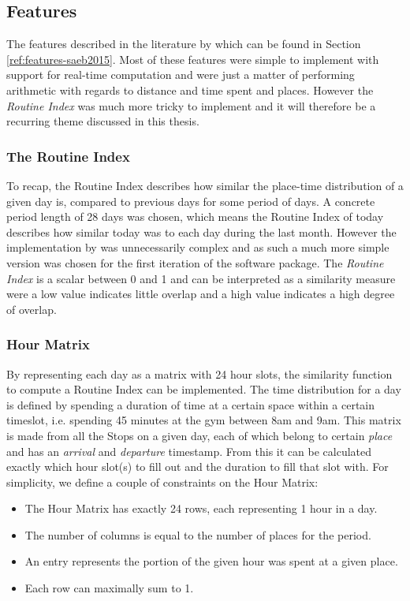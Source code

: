 \subsection{Features}
The features described in the literature by \cite{Saeb2015} which can be found in Section \ref{ref:features-saeb2015}. Most of these features were simple to implement with support for real-time computation and were just a matter of performing arithmetic with regards to distance and time spent and places. However the \textit{Routine Index} \cite{Saeb2015, Canzian2015} was much more tricky to implement and it will therefore be a recurring theme discussed in this thesis.

\subsubsection*{The Routine Index}
To recap, the Routine Index describes how similar the place-time distribution of a given day is, compared to previous days for some period of days. A concrete period length of 28 days was chosen, which means the Routine Index of today describes how similar today was to each day during the last month. However the implementation by \cite{Canzian2015} was unnecessarily complex and as such a much more simple version was chosen for the first iteration of the software package. The \textit{Routine Index} is a scalar between 0 and 1 and can be interpreted as a similarity measure were a low value indicates little overlap and a high value indicates a high degree of overlap. 

\subsubsection*{Hour Matrix}
By representing each day as a matrix with 24 hour slots, the similarity function to compute a Routine Index can be implemented. The time distribution for a day is defined by spending a duration of time at a certain space within a certain timeslot, i.e. spending 45 minutes at the gym between 8am and 9am. This matrix is made from all the Stops on a given day, each of which belong to certain \textit{place} and has an \textit{arrival} and \textit{
departure} timestamp. From this it can be calculated exactly which hour slot(s) to fill out and the duration to fill that slot with. For simplicity, we define a couple of constraints on the Hour Matrix:

\begin{itemize}
    \item The Hour Matrix has exactly 24 rows, each representing 1 hour in a day.
    \item The number of columns is equal to the number of places for the period. 
    \item An entry represents the portion of the given hour was spent at a given place.
    \item Each row can maximally sum to 1.
\end{itemize}

